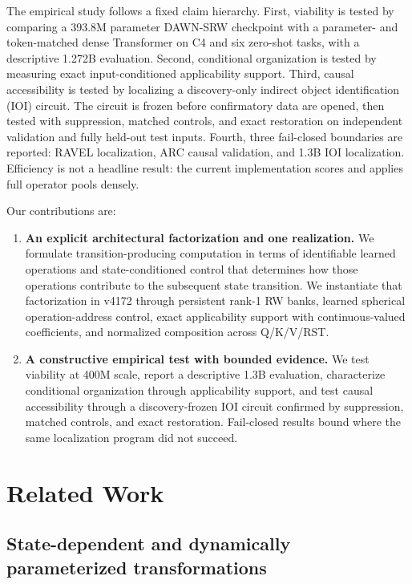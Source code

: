 \documentclass{article}
\newcommand{\DAWN}{DAWN-SRW}
\begin{document}
The empirical study follows a fixed claim hierarchy. First, viability is tested
by comparing a 393.8M parameter \DAWN{} checkpoint with a parameter- and
token-matched dense Transformer on C4 and six zero-shot tasks, with a descriptive
1.272B evaluation. Second, conditional organization is tested by measuring exact
input-conditioned applicability support. Third, causal accessibility is tested
by localizing a discovery-only indirect object identification (IOI) circuit. The circuit is
frozen before confirmatory data are opened, then tested with suppression,
matched controls, and exact restoration on independent validation and fully
held-out test inputs. Fourth, three fail-closed boundaries are reported: RAVEL
localization, ARC causal validation, and 1.3B IOI localization. Efficiency is
not a headline result: the current implementation scores and applies full
operator pools densely.

Our contributions are:
\begin{enumerate}
    \item \textbf{An explicit architectural factorization and one realization.}
    We formulate transition-producing computation in terms of identifiable
    learned operations and state-conditioned control that determines how those
    operations contribute to the subsequent state transition. We instantiate
    that factorization in
    v4172 through persistent rank-1 RW banks, learned spherical operation-address
    control, exact applicability support with continuous-valued coefficients,
    and normalized composition across Q/K/V/RST.
    \item \textbf{A constructive empirical test with bounded evidence.} We test
    viability at 400M scale, report a descriptive 1.3B evaluation, characterize
    conditional organization through applicability support, and test causal
    accessibility through a discovery-frozen IOI circuit confirmed by
    suppression, matched controls, and exact restoration. Fail-closed results
    bound where the same localization program did not succeed.
\end{enumerate}

\section{Related Work}
\label{sec:related}

\subsection{State-dependent and dynamically parameterized transformations}
\end{document}
